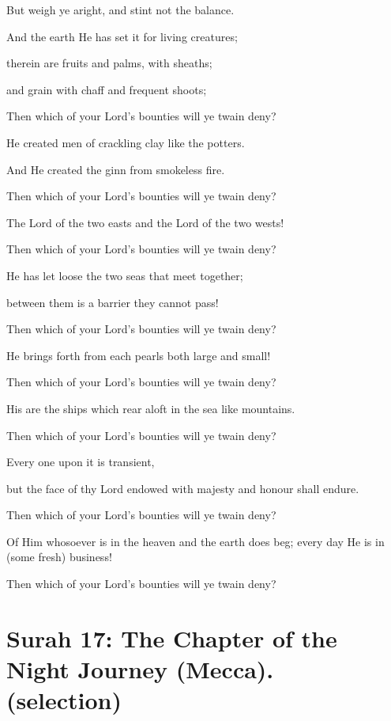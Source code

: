 \documentclass[fontsize=14pt, letterpaper, notitlepage, openany, DIV=12]{scrbook} %
\begin{document}
\noindent[55:9]
But weigh ye aright, and stint not the balance.

\noindent[55:10]
And the earth He has set it for living creatures;

\noindent[55:11]
therein are fruits and palms, with sheaths;

\noindent[55:12]
and grain with chaff and frequent shoots;

\noindent[55:13]
Then which of your Lord's bounties will ye twain deny?

\noindent[55:14]
He created men of crackling clay like the potters.

\noindent[55:15]
And He created the ginn from smokeless fire.

\noindent[55:16]
Then which of your Lord's bounties will ye twain deny?

\noindent[55:17]
The Lord of the two easts and the Lord of the two wests!

\noindent[55:18]
Then which of your Lord's bounties will ye twain deny?

\noindent[55:19]
He has let loose the two seas that meet together;

\noindent[55:20]
between them is a barrier they cannot pass!

\noindent[55:21]
Then which of your Lord's bounties will ye twain deny?

\noindent[55:22]
He brings forth from each pearls both large and small!

\noindent[55:23]
Then which of your Lord's bounties will ye twain deny?

\noindent[55:24]
His are the ships which rear aloft in the sea like mountains.

\noindent[55:25]
Then which of your Lord's bounties will ye twain deny?

\noindent[55:26]
Every one upon it is transient,

\noindent[55:27]
but the face of thy Lord endowed with majesty and honour shall endure.

\noindent[55:28]
Then which of your Lord's bounties will ye twain deny?

\noindent[55:29]
Of Him whosoever is in the heaven and the earth does beg; every day He is in (some
fresh) business!

\noindent[55:30]
Then which of your Lord's bounties will ye twain deny?


\section[Surah 17: The Chapter of the Night Journey (Mecca).]{Surah 17: The Chapter of the Night Journey (Mecca).\\ (selection)}
\end{document}
